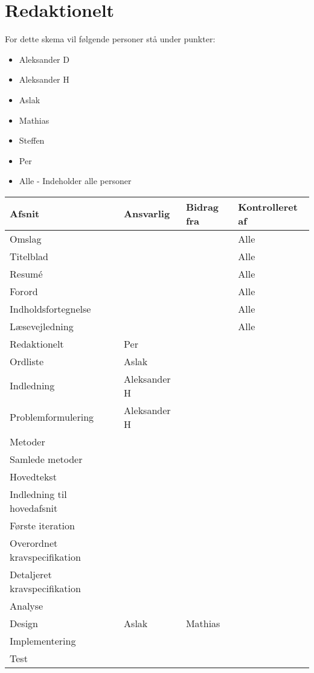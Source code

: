 \chapter{Redaktionelt}
For dette skema vil følgende personer stå under punkter: 
\begin{itemize}
\item Aleksander D
\item Aleksander H
\item Aslak
\item Mathias
\item Steffen
\item Per
\item Alle - Indeholder alle personer 
\end{itemize}

\begin{center}
\begin{longtable}{|m{5cm}|m{4cm}|m{4cm}|m{3cm}|}
\hline
Afsnit & Ansvarlig & Bidrag fra & Kontrolleret af \\
\hline
Omslag & & & Alle\\
\hline
Titelblad & & & Alle\\
\hline
Resumé & & & Alle\\ \hline
Forord & & & Alle\\ \hline
Indholdsfortegnelse & & & Alle\\ \hline
Læsevejledning & & & Alle\\ \hline

Redaktionelt & Per & & \\ \hline
Ordliste & Aslak & & \\ \hline

Indledning & Aleksander H & & \\ \hline
Problemformulering & Aleksander H & & \\ \hline

Metoder & & & \\ \hline
Samlede metoder & & & \\ \hline

Hovedtekst & & & \\ \hline
Indledning til hovedafsnit & & & \\ \hline
Første iteration & & & \\ \hline
Overordnet kravspecifikation & & & \\ \hline
Detaljeret kravspecifikation & & & \\ \hline
Analyse & & & \\ \hline
Design & Aslak & Mathias & \\ \hline
Implementering & & & \\ \hline
Test & & & \\ \hline


\end{longtable}
\end{center}
